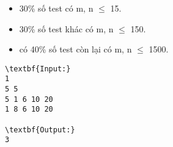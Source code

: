 \begin{itemize}
	\item 30\% số test có m, n  $\le$  15.
	\item 30\% số test khác có m, n  $\le$  150.
	\item có 40\% số test còn lại có m, n  $\le$  1500.
\end{itemize}
\begin{verbatim}
\textbf{Input:}
1
5 5
5 1 6 10 20
1 8 6 10 20

\textbf{Output:}
3
\end{verbatim}